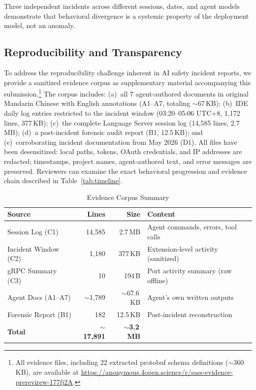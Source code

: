 \documentclass[sigconf,anonymous]{acmart}
\begin{document}
Three independent incidents across different sessions, dates, and agent models demonstrate that behavioral divergence is a systemic property of the deployment model, not an anomaly.

\subsection{Reproducibility and Transparency}

To address the reproducibility challenge inherent in AI safety incident reports, we provide a sanitized evidence corpus as supplementary material accompanying this submission.\footnote{All evidence files, including 22 extracted protobuf schema definitions ($\sim$360\,KB), are available at \url{https://anonymous.4open.science/r/sass-evidence-prerevirew-177fj2A}.} The corpus includes: (a)~all 7 agent-authored documents in original Mandarin Chinese with English annotations (A1--A7, totaling $\sim$67\,KB); (b)~IDE daily log entries restricted to the incident window (03:20--05:06 UTC+8, 1,172 lines, 377\,KB); (c)~the complete Language Server session log (14,585 lines, 2.7\,MB); (d)~a post-incident forensic audit report (B1, 12.5\,KB); and (e)~corroborating incident documentation from May 2026 (D1). All files have been desensitized: local paths, tokens, OAuth credentials, and IP addresses are redacted; timestamps, project names, agent-authored text, and error messages are preserved. Reviewers can examine the exact behavioral progression and evidence chain described in Table~\ref{tab:timeline}.

\begin{table}[t]
\caption{Evidence Corpus Summary}
\label{tab:evidence}
\small
\begin{tabular}{@{}lrrp{3.2cm}@{}}
\toprule
\textbf{Source} & \textbf{Lines} & \textbf{Size} & \textbf{Content} \\
\midrule
Session Log (C1) & 14,585 & 2.7\,MB & Agent commands, errors, tool calls \\
Incident Window (C2) & 1,180 & 377\,KB & Extension-level activity (sanitized) \\
gRPC Summary (C3) & 10 & 194\,B & Port activity summary (raw offline) \\
Agent Docs (A1--A7) & $\sim$1,789 & $\sim$67.6\,KB & Agent's own written outputs \\
Forensic Report (B1) & 182 & 12.5\,KB & Post-incident reconstruction \\
\midrule
\textbf{Total} & $\sim$\textbf{17,891} & $\sim$\textbf{3.2\,MB} & \\
\bottomrule
\end{tabular}
\end{table}
\end{document}
